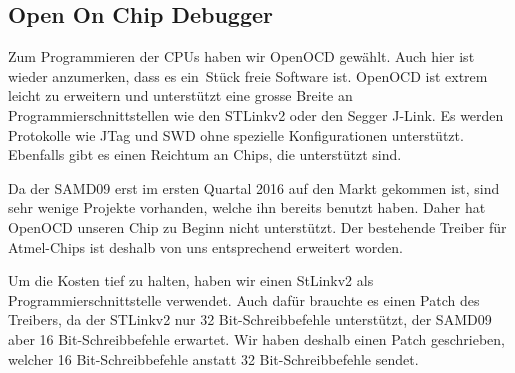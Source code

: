 \subsection{Open On Chip Debugger}

Zum Programmieren der  CPUs haben wir OpenOCD gew\"ahlt. Auch  hier ist wieder
anzumerken, dass es ein St\"uck freie Software ist. OpenOCD ist extrem leicht
zu erweitern und unterst\"utzt eine grosse Breite an Programmierschnittstellen
wie den STLinkv2 oder den Segger J-Link. Es werden Protokolle wie JTag und SWD
ohne spezielle Konfigurationen unterst\"utzt. Ebenfalls gibt es einen Reichtum
an Chips, die unterst\"utzt sind.

Da der  SAMD09 erst im  ersten Quartal 2016 auf  den Markt gekommen  ist, sind
sehr wenige Projekte  vorhanden, welche ihn bereits benutzt  haben.  Daher hat
OpenOCD  unseren Chip  zu Beginn  nicht unterst\"utzt. Der  bestehende Treiber
f\"ur Atmel-Chips ist deshalb von uns entsprechend erweitert worden.

Um   die   Kosten   tief   zu   halten,   haben   wir   einen   StLinkv2   als
Programmierschnittstelle verwendet. Auch  daf\"ur brauchte es einen  Patch des
Treibers,  da  der  STLinkv2  nur  32  Bit-Schreibbefehle  unterst\"utzt,  der
SAMD09  aber 16  Bit-Schreibbefehle  erwartet. Wir haben  deshalb einen  Patch
geschrieben,  welcher  16  Bit-Schreibbefehle  anstatt  32  Bit-Schreibbefehle
sendet.
